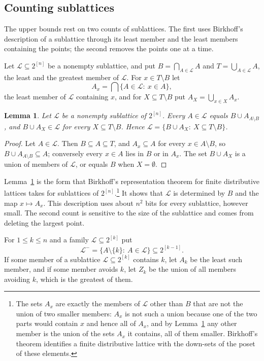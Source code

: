 \documentclass[11pt,reqno]{amsart}
\numberwithin{equation}{section}
\theoremstyle{plain}
\newtheorem{lemma}[theorem]{Lemma}
\theoremstyle{definition}
\theoremstyle{remark}
\newcommand{\cL}{\mathcal{L}}
\begin{document}
\subsection{Counting sublattices}

The upper bounds rest on two counts of sublattices. The first uses
Birkhoff's description of a sublattice through its least member and the
least members containing the points; the second removes the points one at
a time.

Let $\cL\subseteq2^{[n]}$ be a nonempty sublattice, and put
$B=\bigcap_{A\in\cL}A$ and $T=\bigcup_{A\in\cL}A$, the least and the
greatest member of $\cL$. For $x\in T\setminus B$ let
\[
A_x=\bigcap\{A\in\cL:\ x\in A\},
\]
the least member of $\cL$ containing $x$, and for $X\subseteq
T\setminus B$ put $A_X=\bigcup_{x\in X}A_x$.

\begin{lemma}
\label{lem:structure}
Let $\cL$ be a nonempty sublattice of $2^{[n]}$. Every $A\in\cL$ equals
$B\cup A_{A\setminus B}$, and $B\cup A_X\in\cL$ for every $X\subseteq
T\setminus B$. Hence $\cL=\{B\cup A_X:\ X\subseteq T\setminus B\}$.
\end{lemma}

\begin{proof}
Let $A\in\cL$. Then $B\subseteq A\subseteq T$, and $A_x\subseteq A$ for
every $x\in A\setminus B$, so $B\cup A_{A\setminus B}\subseteq A$;
conversely every $x\in A$ lies in $B$ or in $A_x$. The set $B\cup A_X$ is
a union of members of $\cL$, or equals $B$ when $X=\emptyset$.
\end{proof}

Lemma~\ref{lem:structure} is the form that Birkhoff's representation
theorem for finite distributive lattices \cite{Bi37} takes for
sublattices of $2^{[n]}$.\footnote{The sets $A_x$ are exactly the members
of $\cL$ other than $B$ that are not the union of two smaller members:
$A_x$ is not such a union because one of the two parts would contain
$x$ and hence all of $A_x$, and by Lemma~\ref{lem:structure} any other member is the
union of the sets $A_x$ it contains, all of them smaller. Birkhoff's
theorem identifies a finite distributive lattice with the down-sets of
the poset of these elements.} It shows that $\cL$ is determined by $B$
and the map $x\mapsto A_x$. This description uses about $n^{2}$ bits for
every sublattice, however small. The second count is sensitive to the
size of the sublattice and comes from deleting the largest point.

For $1\le k\le n$ and a family $\cL\subseteq2^{[k]}$ put
\[
\cL^{-}=\bigl\{A\setminus\{k\}:\ A\in\cL\bigr\}\subseteq2^{[k-1]} .
\]
If some member of a sublattice $\cL\subseteq2^{[k]}$ contains $k$, let
$A_k$ be the least such member, and if some member avoids $k$, let $Z_k$
be the union of all members avoiding $k$, which is the greatest of them.
\end{document}
